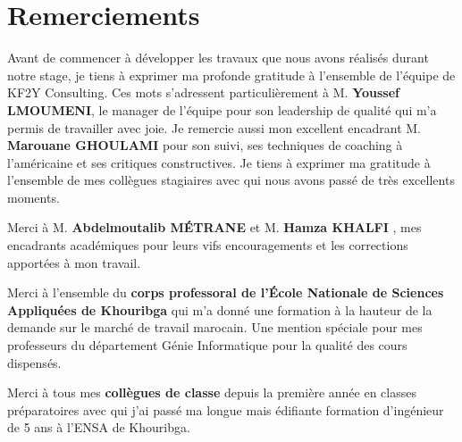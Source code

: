 \chapter*{Remerciements}
Avant de commencer à développer les travaux que nous avons réalisés durant notre stage, je tiens à exprimer ma profonde gratitude à l’ensemble de l’équipe de KF2Y Consulting. Ces mots s’adressent particulièrement à M. \textbf{Youssef LMOUMENI}, le manager de l’équipe pour son leadership de qualité qui m’a permis de travailler avec joie. Je remercie aussi mon excellent encadrant M. \textbf{Marouane GHOULAMI} pour son suivi, ses techniques de coaching à l’américaine et ses critiques constructives. Je tiens à exprimer ma gratitude à l’ensemble de mes collègues stagiaires avec qui nous avons passé de très excellents moments. 


Merci à M. \textbf{Abdelmoutalib MÉTRANE} et M. \textbf{Hamza KHALFI} , mes encadrants académiques pour leurs vifs encouragements et les corrections apportées à mon travail.


Merci à l’ensemble du \textbf{corps professoral de l’École Nationale de Sciences Appliquées de Khouribga} qui m’a donné une formation à la hauteur de la demande sur le marché de travail marocain. Une mention spéciale pour mes professeurs du département Génie Informatique pour la qualité des cours dispensés.


Merci à tous mes \textbf{collègues de classe} depuis la première année en classes préparatoires avec qui j’ai passé ma longue mais édifiante formation d’ingénieur de 5 ans à l’ENSA de Khouribga. 
